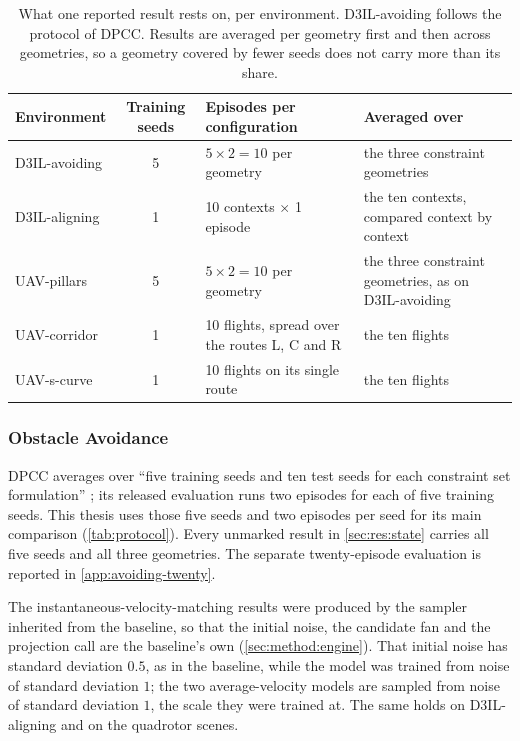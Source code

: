 \begin{table}[htpb]
  \caption[Evaluation protocol per environment]{What one reported result rests on, per environment.
  D3IL-avoiding follows the protocol of \ac{DPCC}. Results are averaged per geometry first and then
  across geometries, so a geometry covered by fewer seeds does not carry more than its share.}
  \label{tab:protocol}
  \centering
  \small
  \setlength{\tabcolsep}{6pt}
  \renewcommand{\arraystretch}{1.2}
  \begin{tabularx}{\linewidth}{@{}l c L X@{}}
    \toprule
    Environment & Training seeds & Episodes per configuration & Averaged over \\
    \midrule
    D3IL-avoiding & 5
      & $5\times2 = 10$ per geometry
      & the three constraint geometries \\
    D3IL-aligning & 1
      & 10 contexts $\times$ 1 episode
      & the ten contexts, compared context by context \\
    UAV-pillars & 5 & $5\times2 = 10$ per geometry & the three constraint geometries, as on D3IL-avoiding \\
    UAV-corridor & 1 & 10 flights, spread over the routes L, C and R & the ten flights \\
    UAV-s-curve & 1 & 10 flights on its single route & the ten flights \\
    \bottomrule
  \end{tabularx}
\end{table}

\subsubsection{Obstacle Avoidance}\label{sec:setup:protocol:avoiding}

\ac{DPCC} averages over \enquote{five training seeds and ten test seeds for each constraint set
formulation} \parencite[Sec.~6.1]{romer2025diffusion}; its released evaluation runs two episodes for each of
five training seeds. This thesis uses those five seeds and two episodes per seed for its main comparison
(\autoref{tab:protocol}). Every unmarked result in \autoref{sec:res:state} carries all five seeds and all
three geometries. The separate twenty-episode evaluation is reported in
\autoref{app:avoiding-twenty}.

The instantaneous-velocity-matching results were produced by the sampler inherited from the baseline, so
that the initial noise, the candidate fan and the projection call are the baseline's own
(\autoref{sec:method:engine}). That initial noise has standard deviation $0.5$, as in the baseline,
while the model was trained from noise of standard deviation $1$; the two average-velocity models are
sampled from noise of standard deviation $1$, the scale they were trained at. The same holds on
D3IL-aligning and on the quadrotor scenes.

